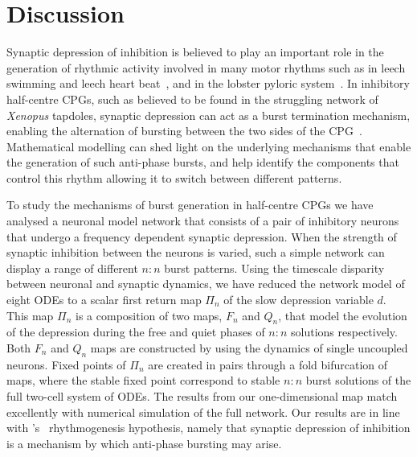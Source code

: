 \section{Discussion}
Synaptic depression of inhibition is believed to play an important role in the generation of rhythmic activity involved in many motor rhythms such as in leech swimming \citep{mangan1994} and leech heart beat~\citep{calabrese1995}, and in the lobster pyloric system~\citep{manor1997, rabbah2007}. In inhibitory half-centre CPGs, such as believed to be found in the struggling network of \textit{Xenopus} tapdoles,  synaptic depression can act as a burst termination mechanism, enabling the alternation of bursting between the two sides of the CPG~\citep{li2007}. Mathematical modelling can shed light on the underlying mechanisms that enable the generation of such anti-phase bursts, and help identify the components that control this rhythm allowing it to switch between different patterns.

To study the mechanisms of burst generation in half-centre CPGs we have analysed a neuronal model network that consists of a pair of inhibitory neurons that undergo a frequency dependent synaptic depression. When the strength of synaptic inhibition between the neurons is varied, such a simple network can display a range of different $n:n$ burst patterns. Using the timescale disparity between neuronal and synaptic dynamics, we have reduced the network model of eight ODEs to a scalar first return map $\Pi_n$ of the slow depression variable $d$. This map $\Pi_n$ is a composition of two maps, $F_n$ and $Q_n$, that model the evolution of the depression during the free and quiet phases of $n:n$ solutions respectively. Both $F_n$ and $Q_n$ maps are constructed by using the dynamics of single uncoupled neurons. Fixed points of $\Pi_n$ are created in pairs through a fold bifurcation of maps, where the stable fixed point correspond to stable $n:n$ burst solutions of the full two-cell system of ODEs. The results from our one-dimensional map match excellently with numerical simulation of the full network. Our results are in line with \citeauthor{brown1911}'s~\citeyear{brown1911} rhythmogenesis hypothesis, namely that synaptic depression of inhibition is a mechanism by which anti-phase bursting may arise.


